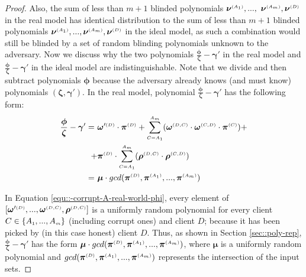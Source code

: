 \begin{proof}
Also, the sum of less than $m+1$ blinded polynomials ${\bm\nu}^{\scriptscriptstyle (A_{\scriptscriptstyle 1})},...,$ ${\bm\nu}^{\scriptscriptstyle (A_{\scriptscriptstyle m})}, \bm\nu^{ \scriptscriptstyle {  {(D)}}}$   in the real model has identical distribution to the sum of less than $m+1$ blinded polynomials $ {\bm\nu}^{\scriptscriptstyle (A_{\scriptscriptstyle 1})},...,  {\bm\nu}^{\scriptscriptstyle (A_{\scriptscriptstyle m})},  {\bm\nu}^{ \scriptscriptstyle {  {(D)}}}$ in the ideal model, as such a combination would still be blinded by a set of random blinding polynomials unknown to the adversary. Now we discuss why the two polynomials $\frac{\bm\phi}{\bm\zeta}- \bm\gamma'$ in the real model and $\frac{ {\bm\phi}} { {\bm\zeta}}-  {\bm\gamma'}$ in the ideal model are indistinguishable. Note that we divide and then subtract  polynomials ${\bm\phi}$ because the adversary already knows (and must know) polynomials $(\bm\zeta, \bm\gamma')$. In the real model, polynomial $\frac{\bm\phi}{\bm\zeta}- \bm\gamma'$ has the following form: 
%
\begin{equation}\label{equ::-corrupt-A-real-world-phi}
%
\begin{split}
 \frac{\bm\phi}{\bm\zeta}- \bm\gamma'=\ &  \bm\omega'^{ \st {  {(D)}}}\cdot \bm\pi^{ \st {  {(D)}} } +\sum\limits^{ \st {   A}_{ \st {   m}}}_{ \st {  {C }= }  \st {   A}_{ \st {  1}}}(\bm\omega^{ \st {  {(D,C)}}} \cdot \bm\omega^{ \st {  {(C,D)}}}\cdot \bm\pi^{ \st {  (C)}})+ \\+ & \bm\pi^{ \st {  {(D)}}}\cdot\sum\limits^{ \st {   A}_{ \st {   m}}}_{ \st {  {C }= }  \st {   A}_{ \st {  1}}}(\bm\rho^{ \st {  {(D,C)}}} \cdot \bm\rho^{ \st {  {(C,D)}}})\\=\ &\bm\mu\cdot gcd( \bm\pi^{ \st {  {(D)}} },\bm\pi^{\st (A_1)}, ..., \bm\pi^{\st (A_m)})
 \end{split}
\end{equation}

In Equation \ref{equ::-corrupt-A-real-world-phi}, every element of   $[\bm\omega'^{ \scriptscriptstyle {  {(D)}}},..., \bm\omega^{ \scriptscriptstyle {  {(D,C)}}}, \bm\rho^{ \scriptscriptstyle {  {(D,C)}}}]$ is a uniformly random polynomial for every  client $C\in \{  {  A}_{ \scriptscriptstyle {   1}}, ...,   {  A}_{ \scriptscriptstyle {   m}}\}$  (including corrupt ones) and client $D$; because it has been picked by (in this case honest) client $D$. Thus,  as shown in Section \ref{sec::poly-rep}, $\frac{\bm\phi}{\bm\zeta}- \bm\gamma'$ has the form $\bm\mu\cdot gcd( \bm\pi^{ \scriptscriptstyle {  {(D)}} },\bm\pi^{\scriptscriptstyle (A_1)}, ..., \bm\pi^{\scriptscriptstyle (A_m)})$, where $\bm\mu$ is a uniformly random polynomial and $gcd( \bm\pi^{ \scriptscriptstyle {  {(D)}} },\bm\pi^{\scriptscriptstyle (A_1)}, ..., \bm\pi^{\scriptscriptstyle (A_m)})$ represents the intersection of the input sets. 


\end{proof}
